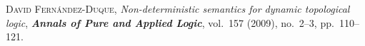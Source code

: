 \documentclass[bsl,meeting]{asl}
\begin{document}
\begin{thebibliography}{10}


{\scshape David Fern\'andez-Duque},
{\itshape Non-deterministic semantics for dynamic topological logic},
{\bfseries\itshape Annals of Pure and Applied Logic},
vol.~157 (2009), no.~2--3, pp.~110--121.

\end{thebibliography}


\vspace*{-0.5\baselineskip}
\end{document}
